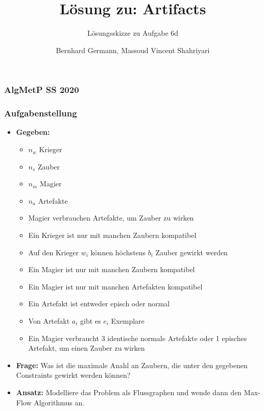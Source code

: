 \documentclass[10pt,dvipsnames]{beamer}
\title{Lösung zu: Artifacts}
\author{Bernhard Germann, Massoud Vincent Shahriyari}
\subtitle{Lösungsskizze zu Aufgabe 6d}
\begin{document}
  \begin{frame}
    \frametitle{AlgMetP SS 2020}
    \titlepage
  \end{frame}

  \begin{frame}
    \frametitle{Aufgabenstellung}
    \begin{itemize}
      \item \textbf{Gegeben:}
      \begin{itemize}
        \item $n_w$ Krieger
        \item $n_s$ Zauber
        \item $n_m$ Magier
        \item $n_a$ Artefakte
        \item Magier verbrauchen Artefakte, um Zauber zu wirken
        \item Ein Krieger ist nur mit manchen Zaubern kompatibel
        \item Auf den Krieger $w_i$ können höchstens $b_i$ Zauber gewirkt werden
        \item Ein Magier ist nur mit manchen Zaubern kompatibel
        \item Ein Magier ist nur mit manchen Artefakten kompatibel
        \item Ein Artefakt ist entweder episch oder normal
        \item Von Artefakt $a_i$ gibt es $e_i$ Exemplare
        \item Ein Magier verbraucht 3 identische normale Artefakte oder 1 episches Artefakt, um einen Zauber zu wirken
      \end{itemize}
      
      \item \textbf{Frage:} Was ist die maximale Anahl an Zaubern, die unter den gegebenen Constraints gewirkt werden können?
      
      \item \textbf{Ansatz:} Modelliere das Problem als Flussgraphen und wende dann den Max-Flow Algorithmus an.
    \end{itemize}
  \end{frame}
  
\end{document}

